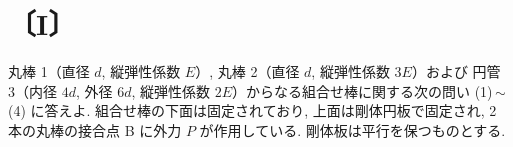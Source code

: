 
\section*{〔I〕}

丸棒 1（直径 $d$, 縦弾性係数 $E$）, 丸棒 2（直径 $d$, 縦弾性係数 $3E$）および
円管 3（内径 $4d$, 外径 $6d$, 縦弾性係数 $2E$）からなる組合せ棒に関する次の問い
(1)\,$\sim$\,(4) に答えよ. 組合せ棒の下面は固定されており, 上面は剛体円板で固定され,
2 本の丸棒の接合点 B に外力 $P$ が作用している. 剛体板は平行を保つものとする.

